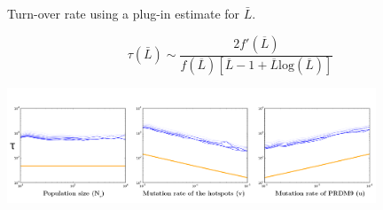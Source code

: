\documentclass[10pt]{beamer}
\begin{document}
\begin{frame}
	\begin{center}
		\Large
    Turn-over rate using a plug-in estimate for $\bar{L}$.
	\end{center}
\[
  \tau (\bar{L}) \sim \dfrac{2 f'(\overline{L})}{f(\overline{L})[\overline{L}-1 + \overline{L} \mathrm{log}(\overline{L})]}
\]
	\begin{center}
       \includegraphics[width=11cm]{Images/estimated-turn-over.png}
	\end{center}
\end{frame}
\end{document}
